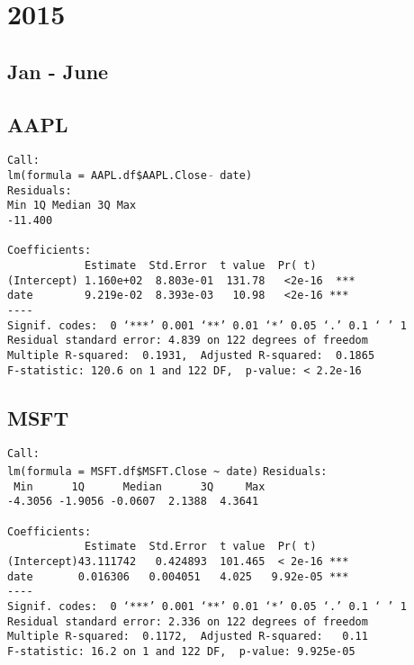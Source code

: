\documentclass{article}[14pt]
\begin{document}
\section{ 2015}

\subsection{Jan - June}
\subsection{AAPL}

\texttt{Call: \\
lm(formula = AAPL.df\$AAPL.Close $\tilde{}$ date)\\
Residuals:\\
Min \hspace{35pt} 1Q \qquad Median \qquad 3Q \qquad  Max\\
-11.400        \\}
\verb| |\\
\verb|Coefficients:|\\
\verb|            Estimate  Std.Error  t value  Pr( t)|\\
\verb|(Intercept) 1.160e+02  8.803e-01  131.78   <2e-16  ***|\\
\verb|date        9.219e-02  8.393e-03   10.98   <2e-16 ***|\\
\verb|----|\\
\verb|Signif. codes:  0 ‘***’ 0.001 ‘**’ 0.01 ‘*’ 0.05 ‘.’ 0.1 ‘ ’ 1|\\
\verb|Residual standard error: 4.839 on 122 degrees of freedom|\\
\verb|Multiple R-squared:  0.1931,	Adjusted R-squared:  0.1865 |\\
\verb|F-statistic: 120.6 on 1 and 122 DF,  p-value: < 2.2e-16|

\subsection{MSFT}
\verb|Call:|\\
\verb|lm(formula = MSFT.df$MSFT.Close ~ date)|
\verb|Residuals:|\\
\verb| Min      1Q      Median      3Q     Max |\\
\verb|-4.3056 -1.9056 -0.0607  2.1388  4.3641 |\\
\verb| |\\
\verb|Coefficients:|\\
\verb|            Estimate  Std.Error  t value  Pr( t)|\\
\verb|(Intercept)43.111742   0.424893  101.465  < 2e-16 ***|\\
\verb|date       0.016306   0.004051   4.025   9.92e-05 ***|\\
\verb|----|\\
\verb|Signif. codes:  0 ‘***’ 0.001 ‘**’ 0.01 ‘*’ 0.05 ‘.’ 0.1 ‘ ’ 1|\\
\verb|Residual standard error: 2.336 on 122 degrees of freedom|\\
\verb|Multiple R-squared:  0.1172,	Adjusted R-squared:   0.11 |\\
\verb|F-statistic: 16.2 on 1 and 122 DF,  p-value: 9.925e-05|
\end{document}
